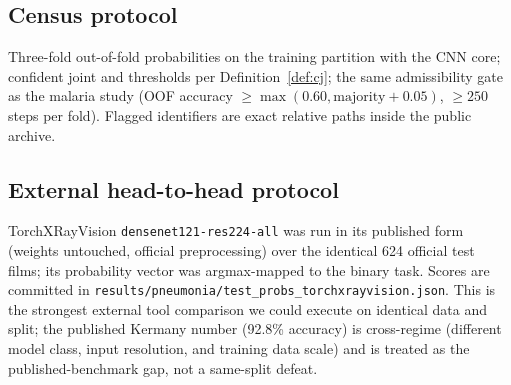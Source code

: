\subsection{Census protocol}
Three-fold out-of-fold probabilities on the training partition with the
CNN core; confident joint and thresholds per Definition~\ref{def:cj}; the
same admissibility gate as the malaria study (OOF accuracy
$\ge \max(0.60, \text{majority}+0.05)$, $\ge 250$ steps per fold). Flagged
identifiers are exact relative paths inside the public archive.
\subsection{External head-to-head protocol}
TorchXRayVision \texttt{densenet121-res224-all} was run in its published
form (weights untouched, official preprocessing) over the identical 624
official test films; its probability vector was argmax-mapped to the
binary task. Scores are committed in
\texttt{results/pneumonia/test\_probs\_torchxrayvision.json}. This is the
strongest external tool comparison we could execute on identical data and
split; the published Kermany number (92.8\% accuracy) is cross-regime
(different model class, input resolution, and training data scale) and is
treated as the published-benchmark gap, not a same-split defeat.
